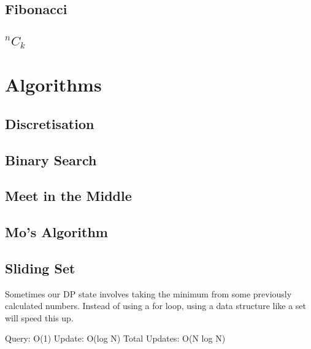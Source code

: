\documentclass{article}
\begin{document}
\subsection{Fibonacci}

\subsection{\texorpdfstring{$^{n}C_{k}$}{}}


\section{Algorithms}
\subsection{Discretisation}


\subsection{Binary Search}


\subsection{Meet in the Middle}


\subsection{Mo's Algorithm}


\subsection{Sliding Set}
\begin{flushleft}
Sometimes our DP state involves taking the minimum from some previously
calculated numbers. Instead of using a for loop, using a data structure like a
set will speed this up.

Query: O(1)
Update: O(log N)
Total Updates: O(N log N)
\end{flushleft}

\end{document}
